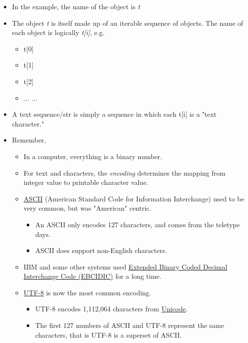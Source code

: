 \documentclass[11pt]{article}
\providecommand{\tightlist}{%
      \setlength{\itemsep}{0pt}\setlength{\parskip}{0pt}}
\begin{document}
\begin{itemize}
\item
  In the example, the name of the object is \emph{t}
\item
  The object \emph{t} is itself made up of an iterable sequence of
  objects. The name of each object is logically \emph{t{[}i{]}}, e.g.

  \begin{itemize}
  \tightlist
  \item
    t{[}0{]}
  \item
    t{[}1{]}
  \item
    t{[}2{]}
  \item
    ... ...
  \end{itemize}
\item
  A text sequence/str is simply a sequence in which each t{[}i{]} is a
  "text character."
\item
  Remember,

  \begin{itemize}
  \tightlist
  \item
    In a computer, everything is a binary number.
  \item
    For text and characters, the \emph{encoding} determines the mapping
    from integer value to printable character value.
  \item
    \href{https://en.wikipedia.org/wiki/ASCII}{ASCII} (American Standard
    Code for Information Interchange) used to be very common, but was
    "American" centric.

    \begin{itemize}
    \tightlist
    \item
      An ASCII only encodes 127 characters, and comes from the teletype
      days.
    \item
      ASCII does support non-English characters.
    \end{itemize}
  \item
    IBM and some other systems used
    \href{https://en.wikipedia.org/wiki/EBCDIC}{Extended Binary Coded
    Decimal Interchange Code (EBCIDIC)} for a long time.\\
  \item
    \href{https://en.wikipedia.org/wiki/UTF-8}{UTF-8} is now the most
    common encoding.

    \begin{itemize}
    \tightlist
    \item
      UTF-8 encodes 1,112,064 characters from
      \href{https://en.wikipedia.org/wiki/Unicode}{Unicode}.
    \item
      The first 127 numbers of ASCII and UTF-8 represent the same
      characters, that is UTF-8 is a superset of ASCII.
    \end{itemize}
  \end{itemize}
\end{itemize}
\end{document}

